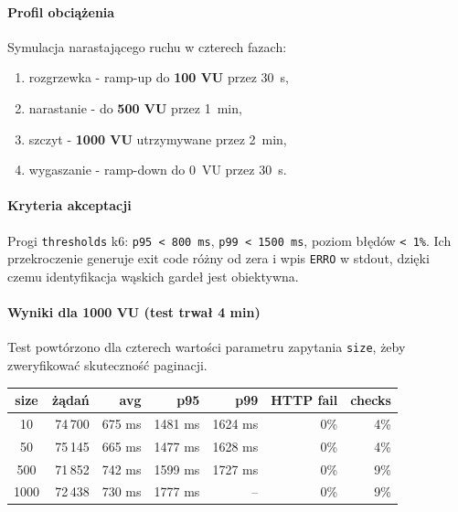 \documentclass[12pt,a4paper]{article}
\begin{document}
\paragraph{Profil obciążenia}
Symulacja narastającego ruchu w czterech fazach:
\begin{enumerate}[leftmargin=*]
  \item rozgrzewka - ramp-up do \textbf{100 VU} przez 30~s,
  \item narastanie - do \textbf{500 VU} przez 1~min,
  \item szczyt - \textbf{1000 VU} utrzymywane przez 2~min,
  \item wygaszanie - ramp-down do 0~VU przez 30~s.
\end{enumerate}

\paragraph{Kryteria akceptacji}
Progi \texttt{thresholds} k6: \texttt{p95~<~800~ms}, \texttt{p99~<~1500~ms},
poziom błędów \texttt{<~1\%}. Ich przekroczenie generuje exit code różny od zera
i wpis \texttt{ERRO} w stdout, dzięki czemu identyfikacja wąskich gardeł jest
obiektywna.

\paragraph{Wyniki dla 1000 VU (test trwał 4 min)}
Test powtórzono dla czterech wartości parametru zapytania \texttt{size},
żeby zweryfikować skuteczność paginacji.

\begin{center}
\begin{tabular}{c r r r r r r}
  \toprule
  \textbf{size} & \textbf{żądań} & \textbf{avg} & \textbf{p95} & \textbf{p99} & \textbf{HTTP fail} & \textbf{checks} \\
  \midrule
  10   & 74\,700 & 675 ms & 1481 ms & 1624 ms & 0\% & 4\% \\
  50   & 75\,145 & 665 ms & 1477 ms & 1628 ms & 0\% & 4\% \\
  500  & 71\,852 & 742 ms & 1599 ms & 1727 ms & 0\% & 9\% \\
  1000 & 72\,438 & 730 ms & 1777 ms & --      & 0\% & 9\% \\
  \bottomrule
\end{tabular}
\end{center}
\end{document}
